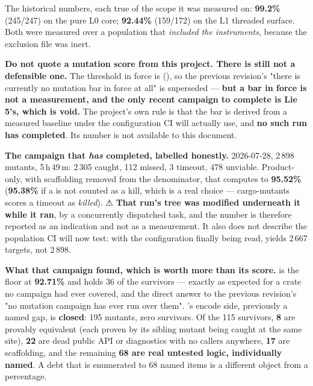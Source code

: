 \documentclass[10.5pt]{article}
\begin{document}
The historical numbers, each true of the scope it was measured on: \textbf{99.2\%} (245/247) on
the pure L0 core; \textbf{92.44\%} (159/172) on the L1 threaded surface. Both were measured over
a population that \emph{included the instruments}, because the exclusion file was inert.

\begin{warnbox}\small
\textbf{Do not quote a mutation score from this project. There is still not a defensible one.}
The threshold in force is  (), so the previous revision's
"there is currently no mutation bar in force at all" is superseded — \textbf{but a bar in force
is not a measurement, and the only recent campaign to complete is Lie 5's, which is void.} The
project's own rule is that the bar is derived from a measured baseline under the configuration CI
will actually use, and \textbf{no such run has completed}. Its number is not available to this
document.

\smallskip
\textbf{The campaign that \emph{has} completed, labelled honestly.} 2026-07-28, 2\,898 mutants,
5\,h\,49\,m: 2\,305 caught, 112 missed, 3 timeout, 478 unviable. Product-only, with scaffolding
removed from the denominator, that computes to \textbf{95.52\%} (\textbf{95.38\%} if a
 is not counted as a kill, which is a real choice — cargo-mutants scores a timeout
as \emph{killed}). ⚠ \textbf{That run's tree was modified underneath it while it ran}, by a
concurrently dispatched task, and the number is therefore reported as an indication and not as a
measurement. It also does not describe the population CI will now test: with the configuration
finally being read,  yields 2\,667 targets, not 2\,898.

\smallskip
\textbf{What that campaign found, which is worth more than its score.}  is the
floor at \textbf{92.71\%} and holds 36 of the survivors — exactly as expected for a crate no
campaign had ever covered, and the direct answer to the previous revision's "no mutation campaign
has ever run over them". 's encode side, previously a named gap, is
\textbf{closed}: 195 mutants, zero survivors. Of the 115 survivors, \textbf{8} are provably
equivalent (each proven by its sibling mutant being caught at the same site), \textbf{22} are dead
public API or  diagnostics with no callers anywhere, \textbf{17} are scaffolding, and
the remaining \textbf{68 are real untested logic, individually named}. A debt that is enumerated
to 68 named items is a different object from a percentage.
\end{warnbox}
\end{document}
